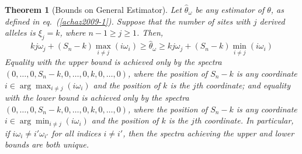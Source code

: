 \documentclass[lettersize, 10pt]{article}
\newtheorem{thm}{Theorem}
\begin{document}
\begin{thm}[Bounds on General Estimator] \label{thm:estimator-bounds}
Let $\hat{\theta}_\omega$ be any estimator of $\theta$, as defined in eq.~(\ref{achaz2009-1}). Suppose that the number of sites with $j$ derived alleles is $\xi_j=k$, where $n-1\geqslant j\geqslant 1$. Then, 
\begin{equation}
kj\omega_j + (S_n-k)\max_{i\neq j}(i\omega_i)\geqslant \hat{\theta}_\omega \geqslant kj\omega_j + (S_n-k)\min_{i\neq j}(i\omega_i) \label{estimator-bounds}
\end{equation}
Equality with the upper bound is achieved only by the spectra $(0,\ldots,0,S_n-k,0,\ldots,0,k,0,\ldots,0)$, where the position of $S_n-k$ is any coordinate $i\in\arg\max_{i\neq j}(i\omega _i)$ and the position of $k$ is the $j$th coordinate; and equality with the lower bound is achieved only by the spectra $(0,\ldots,0,S_n-k,0,\ldots,0,k,0,\ldots,0)$, where the position of $S_n-k$ is any coordinate $i\in\arg\min_{i\neq j}(i\omega _i)$ and the position of $k$ is the $j$th coordinate. In particular, if $i\omega_i\neq i'\omega_{i'}$ for all indices $i\neq i'$, then the spectra achieving the upper and lower bounds are both unique.  
\end{thm}
\end{document}
